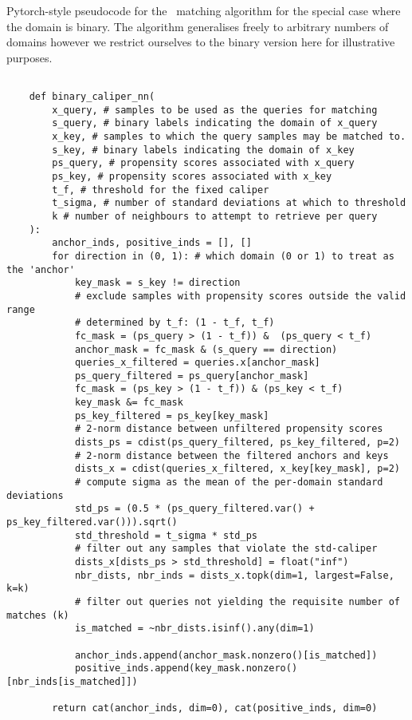 \begin{algorithm}[ht]
     \caption{
         Pytorch-style pseudocode for the \CNN\ matching algorithm for the special case where the
         domain is binary. The algorithm generalises freely to arbitrary numbers of domains however
         we restrict ourselves to the binary version here for illustrative purposes.
}
    \label{alg:calipernn_pc}
    \begin{verbatim}

    def binary_caliper_nn(
        x_query, # samples to be used as the queries for matching
        s_query, # binary labels indicating the domain of x_query
        x_key, # samples to which the query samples may be matched to.
        s_key, # binary labels indicating the domain of x_key
        ps_query, # propensity scores associated with x_query
        ps_key, # propensity scores associated with x_key
        t_f, # threshold for the fixed caliper
        t_sigma, # number of standard deviations at which to threshold
        k # number of neighbours to attempt to retrieve per query
    ):
        anchor_inds, positive_inds = [], []
        for direction in (0, 1): # which domain (0 or 1) to treat as the 'anchor'
            key_mask = s_key != direction
            # exclude samples with propensity scores outside the valid range
            # determined by t_f: (1 - t_f, t_f)
            fc_mask = (ps_query > (1 - t_f)) &  (ps_query < t_f)
            anchor_mask = fc_mask & (s_query == direction)
            queries_x_filtered = queries.x[anchor_mask]
            ps_query_filtered = ps_query[anchor_mask]
            fc_mask = (ps_key > (1 - t_f)) & (ps_key < t_f)
            key_mask &= fc_mask
            ps_key_filtered = ps_key[key_mask]
            # 2-norm distance between unfiltered propensity scores
            dists_ps = cdist(ps_query_filtered, ps_key_filtered, p=2) 
            # 2-norm distance between the filtered anchors and keys
            dists_x = cdist(queries_x_filtered, x_key[key_mask], p=2)
            # compute sigma as the mean of the per-domain standard deviations
            std_ps = (0.5 * (ps_query_filtered.var() + ps_key_filtered.var())).sqrt() 
            std_threshold = t_sigma * std_ps
            # filter out any samples that violate the std-caliper
            dists_x[dists_ps > std_threshold] = float("inf")
            nbr_dists, nbr_inds = dists_x.topk(dim=1, largest=False, k=k)
            # filter out queries not yielding the requisite number of matches (k)
            is_matched = ~nbr_dists.isinf().any(dim=1)

            anchor_inds.append(anchor_mask.nonzero()[is_matched])
            positive_inds.append(key_mask.nonzero()[nbr_inds[is_matched]])

        return cat(anchor_inds, dim=0), cat(positive_inds, dim=0)

    \end{verbatim}
\end{algorithm}
